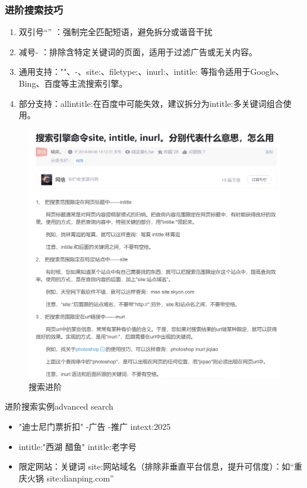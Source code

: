 \subsubsection{进阶搜索技巧}
\begin{enumerate}
  \item 双引号“”  ：强制完全匹配短语，避免拆分或谐音干扰
  \item 减号-    ：排除含特定关键词的页面，适用于过滤广告或无关内容。
  \item 通用支持：""、-、site:、filetype:、inurl:、intitle: 等指令适用于Google、Bing、百度等主流搜索引擎。
  \item 部分支持：allintitle:在百度中可能失效，建议拆分为intitle:多关键词组合使用。
\end{enumerate}
\begin{figure}[H]
  \centering
  \includegraphics[width=.8\textwidth]{./figures/生活/示例2.png}
  \caption{搜索进阶}
\end{figure}
\begin{exbox}{进阶搜索实例}{advanced search}
  \begin{itemize}
    \item "迪士尼门票折扣" -广告 -推广 intext:2025

    \item intitle:"西湖 醋鱼" intitle:老字号

    \item 限定网站：关键词 site:网站域名（排除非垂直平台信息，提升可信度）：如“重庆火锅 site:dianping.com”
  \end{itemize}
\end{exbox}
